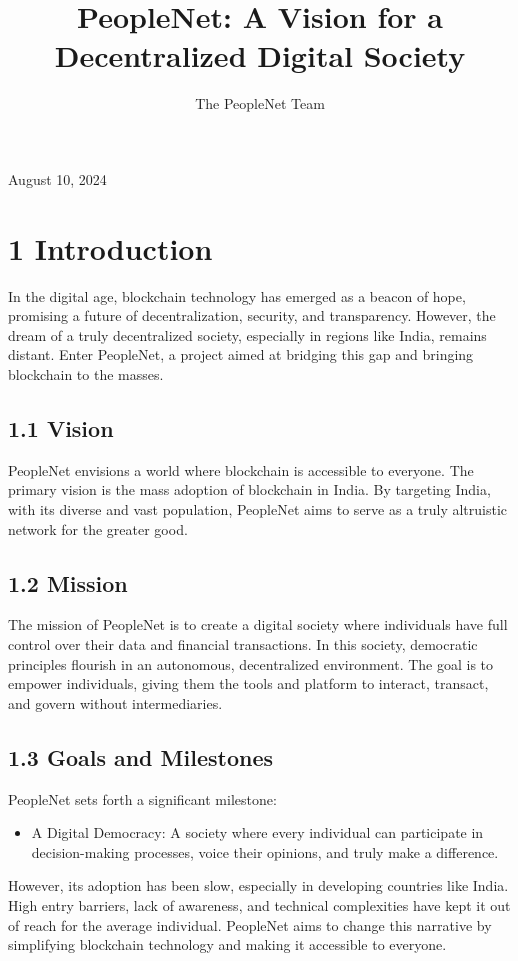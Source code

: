 \documentclass[10pt]{article}
\title{PeopleNet: A Vision for a Decentralized Digital Society }
\author{The PeopleNet Team}
\date{}
\begin{document}
\maketitle
August 10, 2024

\section*{1 Introduction}
In the digital age, blockchain technology has emerged as a beacon of hope, promising a future of decentralization, security, and transparency. However, the dream of a truly decentralized society, especially in regions like India, remains distant. Enter PeopleNet, a project aimed at bridging this gap and bringing blockchain to the masses.

\subsection*{1.1 Vision}
PeopleNet envisions a world where blockchain is accessible to everyone. The primary vision is the mass adoption of blockchain in India. By targeting India, with its diverse and vast population, PeopleNet aims to serve as a truly altruistic network for the greater good.

\subsection*{1.2 Mission}
The mission of PeopleNet is to create a digital society where individuals have full control over their data and financial transactions. In this society, democratic principles flourish in an autonomous, decentralized environment. The goal is to empower individuals, giving them the tools and platform to interact, transact, and govern without intermediaries.

\subsection*{1.3 Goals and Milestones}
PeopleNet sets forth a significant milestone:

\begin{itemize}
  \item A Digital Democracy: A society where every individual can participate in decision-making processes, voice their opinions, and truly make a difference.
\end{itemize}

However, its adoption has been slow, especially in developing countries like India. High entry barriers, lack of awareness, and technical complexities have kept it out of reach for the average individual. PeopleNet aims to change this narrative by simplifying blockchain technology and making it accessible to everyone.
\end{document}
